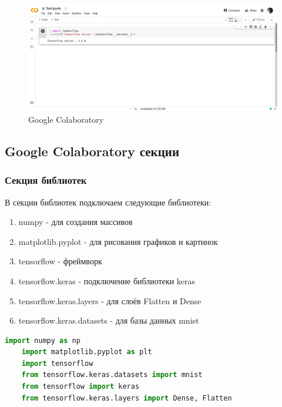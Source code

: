 \begin{figure}[!htbp]
    \centering
    \includegraphics[width=16cm]
    {../_INCLUDES/main/4/GoogleColaboratory.png}
    \caption{Google Colaboratory}
    \label{fig:4_GoogleColaboratory}
\end{figure}



\subsection{Google Colaboratory секции}



\subsubsection*{Секция библиотек}

В секции библиотек подключаем следующие библиотеки:

\begin{enumerate}
    \item numpy - для создания массивов
    \item matplotlib.pyplot - для рисования графиков и картинок
    \item tensorflow - фреймворк
    \item tensorflow.keras - подключение библиотеки keras
    \item tensorflow.keras.layers - для слоёв Flatten и Dense
    \item tensorflow.keras.datasets - для базы данных mnist
\end{enumerate}

\begin{lstlisting}[language=Python,]
    import numpy as np
    import matplotlib.pyplot as plt
    import tensorflow
    from tensorflow.keras.datasets import mnist
    from tensorflow import keras
    from tensorflow.keras.layers import Dense, Flatten
\end{lstlisting}



